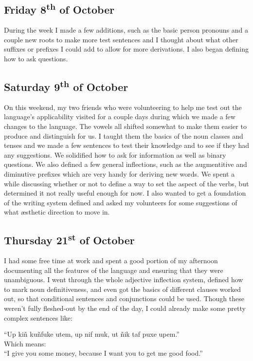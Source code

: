 \documentclass[a4paper,10pt]{article}
\begin{document}
\subsection{Friday 8\textsuperscript{th} of October}
During the week I made a few additions, such as the basic person pronouns and a couple new
roots to make more test sentences and I thought about what other suffixes or prefixes I
could add to allow for more derivations. I also began defining how to ask questions.

\subsection{Saturday 9\textsuperscript{th} of October}
On this weekend, my two friends who were volunteering to help me test out the language's
applicability visited for a couple days during which we made a few changes to the language.
The vowels all shifted somewhat to make them easier to produce and distinguish for us. I
taught them the basics of the noun classes and tenses and we made a few sentences to test
their knowledge and to see if they had any suggestions. We solidified how to ask for
information as well as binary questions. We also defined a few general inflections, such
as the augmentitive and diminutive prefixes which are very handy for deriving new words.
We spent a while discussing whether or not to define a way to set the aspect of the verbs,
but determined it not really useful enough for now. I also wanted to get a foundation of
the writing system defined and asked my volunteers for some suggestions of what \ae sthetic
direction to move in.

\subsection{Thursday 21\textsuperscript{st} of October}
I had some free time at work and spent a good portion of my afternoon documenting all the
features of the language and ensuring that they were unambiguous. I went through the whole
adjective inflection system, defined how to mark noun definitiveness, and even got the
basics of different clauses worked out, so that conditional sentences and conjunctions
could be used. Though these weren't fully fleshed-out by the end of the day, I could
already make some pretty complex sentences like: 

\begin{center}
    ``Up kiñ kuñfuke utem, up nif muk, ut ñik taf puxe upem.'' \\
    Which means:\\
    ``I give you some money, because I want you to get me good food.''
\end{center}
\end{document}
